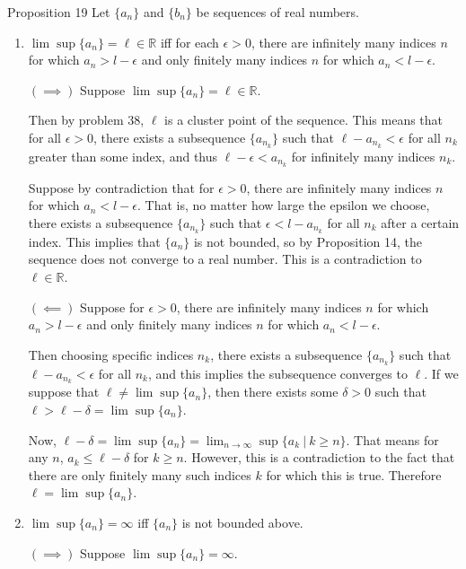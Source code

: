 \begin{flushleft}
\begin{namedthm*}{Proposition 19}
Let $\{a_n \}$ and $\{b_n \}$ be sequences of real numbers.
\begin{enumerate}[label=(\roman*),align=left]
	\item $\lim \sup \{a_n \}=\ell \in \mathbb{R}$ iff for each $\epsilon >0$, there are infinitely many indices $n$ for which $a_n > l-\epsilon $ and only finitely many indices $n$ for which $a_n < l-\epsilon $.\par
	$(\implies)$ Suppose $\lim \sup \{a_n \}=\ell \in \mathbb{R}$.\par
	Then by problem 38, $\ell$ is a cluster point of the sequence. This means that for all $\epsilon > 0$, there exists a subsequence $\{a_{n_k} \}$ such that $ \ell - a_{n_k} < \epsilon$ for all $n_k$ greater than some index, and thus $ \ell - \epsilon < a_{n_k} $ for infinitely many indices $n_k$.\par
	Suppose by contradiction that for $\epsilon >0$, there are infinitely many indices $n$ for which $a_n < l-\epsilon $.
	That is, no matter how large the epsilon we choose, there exists a subsequence $\{a_{n_k} \}$ such that $\epsilon < l-a_{n_k} $ for all $n_k$ after a certain index.
	This implies that $\{a_n\}$ is not bounded, so by Proposition 14, the sequence does not converge to a real number.
	This is a contradiction to $\ell \in \mathbb{R}$.
	\par
	$(\impliedby)$ Suppose for $\epsilon >0$, there are infinitely many indices $n$ for which $a_n > l-\epsilon $ and only finitely many indices $n$ for which $a_n < l-\epsilon $.\par
	Then choosing specific indices $n_k$, there exists a subsequence $\{a_{n_k} \}$ such that $\ell - a_{n_k} <\epsilon $ for all $n_k$, and this implies the subsequence converges to $\ell$.
	If we suppose that $\ell \neq \lim \sup \{a_n \}$, then there exists some $\delta >0$ such that $\ell > \ell - \delta = \lim \sup \{a_n \}$.\par
	Now, $\ell - \delta = \lim \sup \{a_n \} = \lim_{n \to \infty} \sup \{ a_k\ |\ k \ge n\}$.
	That means for any $n$, $a_k \le \ell - \delta$ for $k \ge n$.
	However, this is a contradiction to the fact that there are only finitely many such indices $k$ for which this is true.
	Therefore $\ell = \lim \sup \{a_n \}$.
	\item $\lim \sup \{a_n \}=\infty$ iff $\{a_n \}$ is not bounded above.\par
	$(\implies)$ Suppose $\lim \sup \{a_n \}=\infty$.\par

\end{enumerate}
\end{namedthm*}
\end{flushleft}
